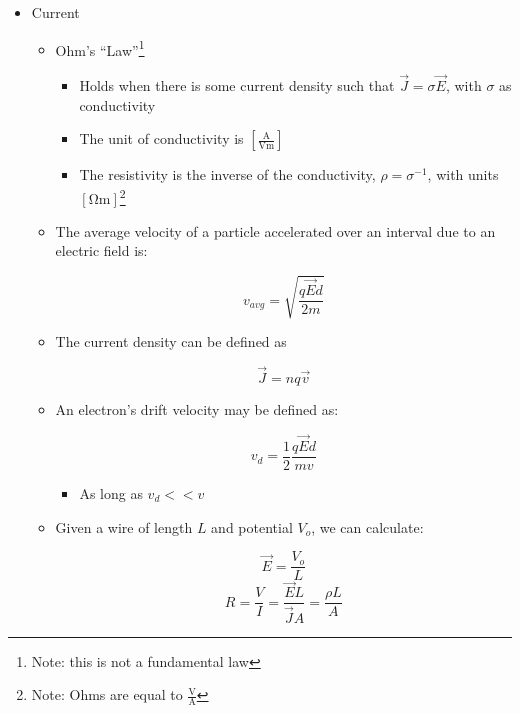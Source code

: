 \begin{itemize}

  \item Current
    
    \begin{itemize}

      \item Ohm's ``Law''\footnote{Note: this is not a fundamental law}

        \begin{itemize}

          \item Holds when there is some current density such that $\vec{J}=\sigma\vec{E}$, with $\sigma$ as conductivity

          \item The unit of conductivity is $\left[ \frac{\si{\ampere}}{\si{\volt\meter}} \right]$

          \item The resistivity is the inverse of the conductivity, $\rho=\sigma^{-1}$, with units $\left[ \si{\ohm\meter} \right]$\footnote{Note: Ohms are equal to $\frac{\si{\volt}}{\si{\ampere}}$}

        \end{itemize}

      \item The average velocity of a particle accelerated over an interval due to an electric field is:

        $$v_{avg}=\sqrt{\frac{q\vec{E}d}{2m}}$$

      \item The current density can be defined as

        $$\vec{J}=nq\vec{v}$$

      \item An electron's drift velocity may be defined as:

        $$v_d=\frac{1}{2}\frac{q\vec{E}d}{mv}$$

        \begin{itemize}

          \item As long as $v_d<<v$

        \end{itemize}

      \item Given a wire of length $L$ and potential $V_o$, we can calculate:

        $$\vec{E}=\frac{V_o}{L}$$
        $$R=\frac{V}{I}=\frac{\vec{E}L}{\vec{J}A}=\frac{\rho L}{A}$$

    \end{itemize}

\end{itemize}



